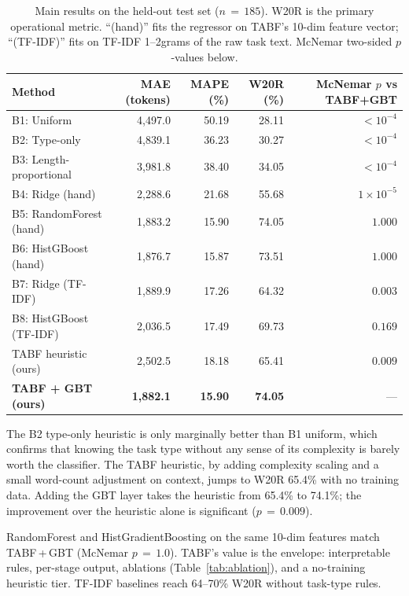 \documentclass{article}
\begin{document}
\begin{table}[h]
  \caption{Main results on the held-out test set ($n\,{=}\,185$).
  W20R is the primary operational metric. ``(hand)'' fits the regressor
  on TABF's 10-dim feature vector; ``(TF-IDF)'' fits on TF-IDF 1--2grams
  of the raw task text. McNemar two-sided $p$-values below.}
  \label{tab:main}
  \centering
  \small
  \begin{tabular}{lrrrr}
    \toprule
    Method & MAE (tokens) & MAPE (\%) & W20R (\%) & McNemar $p$ vs TABF+GBT \\
    \midrule
    B1: Uniform                 & 4{,}497.0 & 50.19 & 28.11 & $<\!10^{-4}$ \\
    B2: Type-only               & 4{,}839.1 & 36.23 & 30.27 & $<\!10^{-4}$ \\
    B3: Length-proportional     & 3{,}981.8 & 38.40 & 34.05 & $<\!10^{-4}$ \\
    B4: Ridge (hand)            & 2{,}288.6 & 21.68 & 55.68 & $1\!\times\!10^{-5}$ \\
    B5: RandomForest (hand)     & 1{,}883.2 & 15.90 & 74.05 & $1.000$ \\
    B6: HistGBoost (hand)       & 1{,}876.7 & 15.87 & 73.51 & $1.000$ \\
    B7: Ridge (TF-IDF)          & 1{,}889.9 & 17.26 & 64.32 & $0.003$ \\
    B8: HistGBoost (TF-IDF)     & 2{,}036.5 & 17.49 & 69.73 & $0.169$ \\
    TABF heuristic (ours)       & 2{,}502.5 & 18.18 & 65.41 & $0.009$ \\
    \textbf{TABF + GBT (ours)}  & \textbf{1{,}882.1}
                                & \textbf{15.90}
                                & \textbf{74.05}
                                & --- \\
    \bottomrule
  \end{tabular}
\end{table}

The B2 type-only heuristic is only marginally better than B1 uniform, which
confirms that knowing the task type without any sense of its
complexity is barely worth the classifier. The TABF heuristic, by
adding complexity scaling and a small word-count adjustment on context,
jumps to W20R 65.4\% with no training data. Adding the GBT layer
takes the heuristic from 65.4\% to 74.1\%; the improvement over the
heuristic alone is significant ($p\,{=}\,0.009$).

RandomForest and HistGradientBoosting on the same 10-dim features match
TABF\,+\,GBT (McNemar $p\,{=}\,1.0$). TABF's value is the envelope:
interpretable rules, per-stage output, ablations (Table~\ref{tab:ablation}),
and a no-training heuristic tier. TF-IDF baselines reach 64--70\% W20R
without task-type rules.
\end{document}
